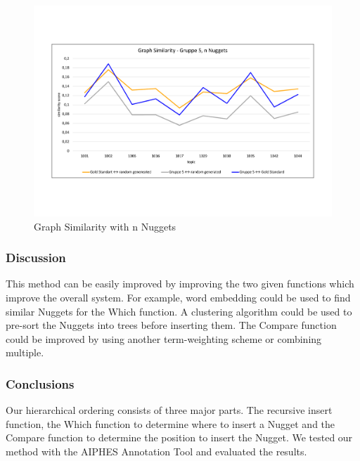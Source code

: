 \begin{figure}[H]
	\centering
	\includegraphics[trim= 0 120 0 120,width=\textwidth]{img/sim_v2.pdf}
	\caption{Graph Similarity with n Nuggets}
	\label{fig:spc}
\end{figure}



\subsubsection{Discussion}




This method can be easily improved by improving the two given functions which improve the overall system. For example, word embedding could be used to find similar Nuggets for the Which function. A clustering algorithm could be used to pre-sort the Nuggets into trees before inserting them. The Compare function could be improved by using another term-weighting scheme or combining multiple.



\subsubsection{Conclusions}

Our hierarchical ordering consists of three major parts. The recursive insert function, the Which function to determine where to insert a Nugget and the Compare function to determine the position to insert the Nugget. We tested our method with the AIPHES Annotation Tool and evaluated the results.


